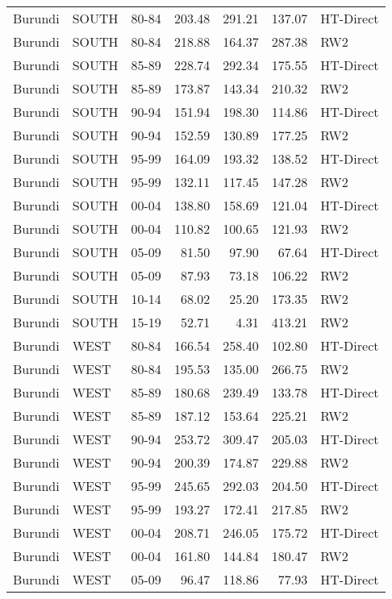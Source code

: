 \begin{longtable}{lllrrrl}
  Burundi & SOUTH & 80-84 & 203.48 & 291.21 & 137.07 & HT-Direct \\ 
  Burundi & SOUTH & 80-84 & 218.88 & 164.37 & 287.38 & RW2 \\ 
  Burundi & SOUTH & 85-89 & 228.74 & 292.34 & 175.55 & HT-Direct \\ 
  Burundi & SOUTH & 85-89 & 173.87 & 143.34 & 210.32 & RW2 \\ 
  Burundi & SOUTH & 90-94 & 151.94 & 198.30 & 114.86 & HT-Direct \\ 
  Burundi & SOUTH & 90-94 & 152.59 & 130.89 & 177.25 & RW2 \\ 
  Burundi & SOUTH & 95-99 & 164.09 & 193.32 & 138.52 & HT-Direct \\ 
  Burundi & SOUTH & 95-99 & 132.11 & 117.45 & 147.28 & RW2 \\ 
  Burundi & SOUTH & 00-04 & 138.80 & 158.69 & 121.04 & HT-Direct \\ 
  Burundi & SOUTH & 00-04 & 110.82 & 100.65 & 121.93 & RW2 \\ 
  Burundi & SOUTH & 05-09 & 81.50 & 97.90 & 67.64 & HT-Direct \\ 
  Burundi & SOUTH & 05-09 & 87.93 & 73.18 & 106.22 & RW2 \\ 
  Burundi & SOUTH & 10-14 & 68.02 & 25.20 & 173.35 & RW2 \\ 
  Burundi & SOUTH & 15-19 & 52.71 & 4.31 & 413.21 & RW2 \\ 
  Burundi & WEST & 80-84 & 166.54 & 258.40 & 102.80 & HT-Direct \\ 
  Burundi & WEST & 80-84 & 195.53 & 135.00 & 266.75 & RW2 \\ 
  Burundi & WEST & 85-89 & 180.68 & 239.49 & 133.78 & HT-Direct \\ 
  Burundi & WEST & 85-89 & 187.12 & 153.64 & 225.21 & RW2 \\ 
  Burundi & WEST & 90-94 & 253.72 & 309.47 & 205.03 & HT-Direct \\ 
  Burundi & WEST & 90-94 & 200.39 & 174.87 & 229.88 & RW2 \\ 
  Burundi & WEST & 95-99 & 245.65 & 292.03 & 204.50 & HT-Direct \\ 
  Burundi & WEST & 95-99 & 193.27 & 172.41 & 217.85 & RW2 \\ 
  Burundi & WEST & 00-04 & 208.71 & 246.05 & 175.72 & HT-Direct \\ 
  Burundi & WEST & 00-04 & 161.80 & 144.84 & 180.47 & RW2 \\ 
  Burundi & WEST & 05-09 & 96.47 & 118.86 & 77.93 & HT-Direct \\ 

\end{longtable}
